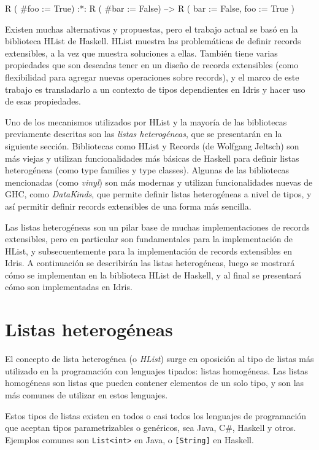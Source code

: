 \begin{code}
R ( #foo := True) :*: R ( #bar := False)
--> R ( bar := False, foo := True )
\end{code}

Existen muchas alternativas y propuestas, pero el trabajo actual se basó en la biblioteca HList de Haskell. HList muestra las problemáticas de definir records extensibles, a la vez que muestra soluciones a ellas. También tiene varias propiedades que son deseadas tener en un diseño de records extensibles (como flexibilidad para agregar nuevas operaciones sobre records), y el marco de este trabajo es transladarlo a un contexto de tipos dependientes en Idris y hacer uso de esas propiedades.

Uno de los mecanismos utilizados por HList y la mayoría de las bibliotecas previamente descritas son las \textit{listas heterogéneas}, que se presentarán en la siguiente sección. Bibliotecas como HList y Records (de Wolfgang Jeltsch) son más viejas y utilizan funcionalidades más básicas de Haskell para definir listas heterogéneas (como type families y type classes). Algunas de las bibliotecas mencionadas (como \textit{vinyl}) son más modernas y utilizan funcionalidades nuevas de GHC, como \textit{DataKinds}, que permite definir listas heterogéneas a nivel de tipos, y así permitir definir records extensibles de una forma más sencilla.

Las listas heterogéneas son un pilar base de muchas implementaciones de records extensibles, pero en particular son fundamentales para la implementación de HList, y subsecuentemente para la implementación de records extensibles en Idris. A continuación se describirán las listas heterogéneas, luego se mostrará cómo se implementan en la biblioteca HList de Haskell, y al final se presentará cómo son implementadas en Idris.

\section{Listas heterogéneas}

El concepto de lista heterogénea (o \textit{HList}) surge en oposición al tipo de listas más utilizado en la programación con lenguajes tipados: listas homogéneas. Las listas homogéneas son listas que pueden contener elementos de un solo tipo, y son las más comunes de utilizar en estos lenguajes.

Estos tipos de listas existen en todos o casi todos los lenguajes de programación que aceptan tipos parametrizables o genéricos, sea Java, C\#, Haskell y otros. Ejemplos comunes son \texttt{List<int>} en Java, o \texttt{[String]} en Haskell.

